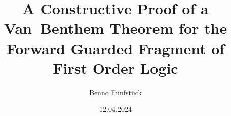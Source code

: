 \date{12.04.2024}
\author{Benno Fünfstück}
\title{A Constructive Proof of a Van~Benthem Theorem for the Forward Guarded Fragment of First Order Logic}
\newcommand{\supervisor}{Bartosz Bednarczyk}
\newcommand{\refereeFst}{Prof. Dr. Sebastian Rudolph}
\newcommand{\refereeSnd}{Dr.-Ing. Stefan Borgwardt}

